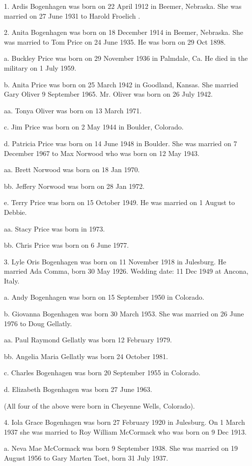 \documentclass[a4paper]{article}
\begin{document}
1. Ardis Bogenhagen was born on 22 April 1912 in Beemer, Nebraska.  She was married on 27 June 1931 to Harold Froelich .

2. Anita Bogenhagen was born on 18 December 1914 in Beemer, Nebraska.  She was married to Tom Price on 24 June 1935.  He was born on 29 Oct 1898.

a. Buckley Price was born on 29 November 1936 in Palmdale, Ca.  He died in the military on 1 July 1959.

b. Anita Price was born on 25 March 1942 in Goodland, Kansas.  She married Gary Oliver 9 September 1965.  Mr. Oliver was born on 26 July 1942.

aa. Tonya Oliver was born on 13 March 1971.

c. Jim Price was born on 2 May 1944 in Boulder, Colorado.

d. Patricia Price was born on 14 June 1948 in Boulder. She was married on 7 December 1967 to Max Norwood who was born on 12 May 1943.

aa. Brett Norwood was born on 18 Jan 1970.

bb. Jeffery Norwood was born on 28 Jan 1972.

e. Terry Price was born on 15 October 1949.  He was married on 1 August to Debbie.

aa. Stacy Price was born in 1973.

bb. Chris Price was born on 6 June 1977.

3. Lyle Oris Bogenhagen was born on 11 November 1918 in Julesburg.  He married Ada Comma, born 30 May 1926.  Wedding date: 11 Dec 1949 at Ancona, Italy.

a. Andy Bogenhagen was born on 15 September 1950 in Colorado.

b. Giovanna Bogenhagen was born 30 March 1953. She was married on 26 June 1976 to Doug Gellatly.

aa. Paul Raymond Gellatly was born 12 February 1979.

bb. Angelia Maria Gellatly was born 24 October 1981.

c. Charles Bogenhagen was born 20 September 1955 in Colorado.

d. Elizabeth Bogenhagen was born 27 June 1963.

(All four of the above were born in Cheyenne Wells, Colorado).

4. Iola Grace Bogenhagen was born 27 February 1920 in Julesburg.  On 1 March 1937 she was married to Roy William McCormack who was born on  9 Dec 1913.

a. Neva Mae McCormack was born 9 September 1938. She was married on 19 August 1956 to Gary Marten Toet, born 31 July 1937.
\end{document}
